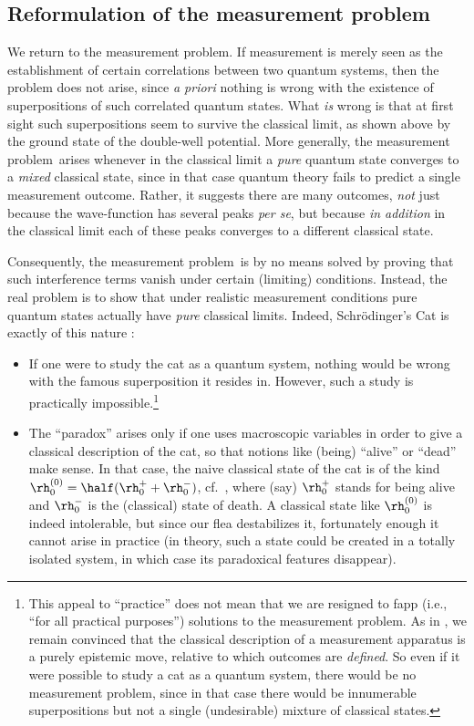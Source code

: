 \documentclass[12pt]{article}
\newcommand{\mmp}{measurement problem}
\begin{document}
 \subsection{Reformulation of the \mmp}\label{sec2.3}
 We return to the \mmp.
If measurement is merely seen as the establishment of certain correlations between two quantum systems, then the problem does not arise, since \emph{a priori} nothing is wrong with the existence of superpositions of such correlated quantum states. What \emph{is} wrong is that at first sight such superpositions seem to survive the classical limit, as shown above by the ground state of the double-well potential. More generally,  the \mmp\ arises 
whenever in the classical limit  a \emph{pure} quantum state converges to a \emph{mixed} classical state, since in that case quantum theory fails to predict a single measurement outcome. Rather, it suggests there are many outcomes, \emph{not} just because the wave-function has several peaks \emph{per se}, but because \emph{in addition} in the classical limit each of these peaks converges to a different classical state.

Consequently, the \mmp\ is by no means  solved by proving that such interference terms vanish under certain (limiting) conditions.
Instead, the real problem is to show that under realistic measurement conditions pure quantum states actually have \emph{pure} classical limits. Indeed, Schr\"{o}dinger's Cat is exactly of this nature \cite[\S 6.6]{handbook}:
\begin{itemize}
\item If one were to study the cat as a quantum system, nothing would be  wrong with the famous superposition it resides in. However, such a study is practically impossible.\footnote{This appeal to ``practice'' does not mean that we are resigned 
to {\sc fapp} (i.e., ``for all practical purposes'') solutions to the \mmp. As in \cite{KlaasObs}, we remain convinced
that the classical description of a measurement apparatus is a purely epistemic move, relative to which 
outcomes are \emph{defined}. So even if it were possible to study a cat  as a quantum system, there would be no \mmp, since in that case there would be innumerable superpositions but not a single (undesirable) mixture of classical states. 
}
\item The ``paradox'' arises only  if one uses macroscopic variables  in order to give a classical description of the cat, so that notions like (being) ``alive'' or ``dead'' make sense. In that case, the naive classical state of the cat is of the kind $\rh_0^{(0)}=\half(\rh_0^+ + \rh_0^-)$, cf.\ , where (say) $\rh_0^+$ stands for being alive and
 $\rh_0^-$ is the (classical) state of death. A classical state like $\rh_0^{(0)}$ is indeed intolerable, but since our flea destabilizes it, fortunately enough it cannot arise in practice (in theory, such a state could be created in a totally isolated system, in which case its paradoxical features disappear).
\end{itemize}
\end{document}
